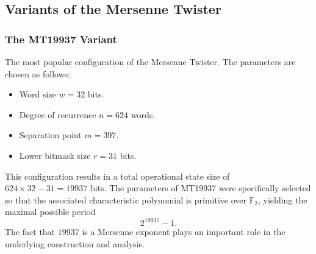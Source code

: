 \subsection{Variants of the Mersenne Twister}

\subsubsection{The MT19937 Variant}
The most popular configuration of the Mersenne Twister. The parameters are chosen as follows:
\begin{itemize}
    \item Word size $w = 32$ bits.
    \item Degree of recurrence $n = 624$ words.
    \item Separation point $m = 397$.
    \item Lower bitmask size $r = 31$ bits.
\end{itemize}
This configuration results in a total operational state size of $624 \times 32 - 31 = 19937$ bits. The parameters of MT19937 were specifically selected so that the associated characteristic polynomial is primitive over $\mathbb{F}_2$, yielding the maximal possible period
\[
2^{19937} - 1.
\]
The fact that $19937$ is a Mersenne exponent plays an important role in the underlying construction and analysis.

